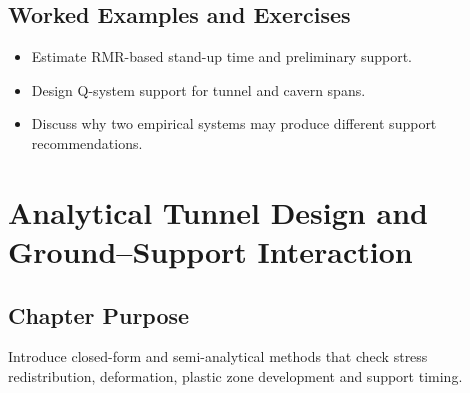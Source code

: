 \documentclass[12pt,oneside]{book}
\begin{document}
\section{Worked Examples and Exercises}
\begin{itemize}
    \item Estimate RMR-based stand-up time and preliminary support.
    \item Design Q-system support for tunnel and cavern spans.
    \item Discuss why two empirical systems may produce different support recommendations.
\end{itemize}

\chapter{Analytical Tunnel Design and Ground--Support Interaction}

\section{Chapter Purpose}
Introduce closed-form and semi-analytical methods that check stress redistribution, deformation, plastic zone development and support timing.
\end{document}

